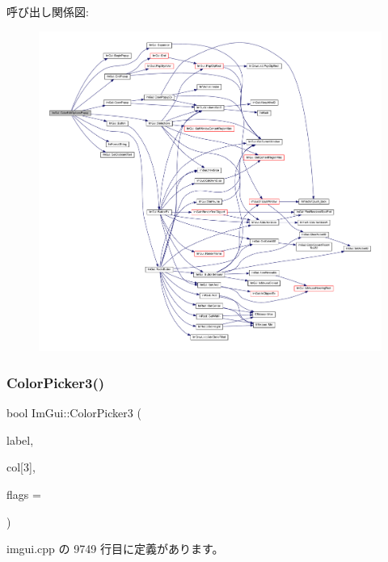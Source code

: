 呼び出し関係図\+:\nopagebreak
\begin{figure}[H]
\begin{center}
\leavevmode
\includegraphics[width=350pt]{namespace_im_gui_a6bfb117816d669f8704e5d0c0c0795fe_cgraph}
\end{center}
\end{figure}
\mbox{\label{namespace_im_gui_a2a2a98cb9a17b18702be6b954670b388}} 
\subsubsection{\texorpdfstring{Color\+Picker3()}{ColorPicker3()}}
{\footnotesize\ttfamily bool Im\+Gui\+::\+Color\+Picker3 (\begin{DoxyParamCaption}\item[{const char $\ast$}]{label,  }\item[{float}]{col\mbox{[}3\mbox{]},  }\item[{\mbox{\hyperlink{imgui_8h_a6b2d5e95adc38f22c021252189f669c6}{Im\+Gui\+Color\+Edit\+Flags}}}]{flags = {} }\end{DoxyParamCaption})}



 imgui.\+cpp の 9749 行目に定義があります。

